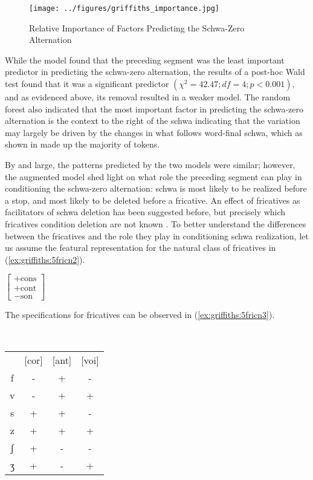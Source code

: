 \documentclass[output=paper,colorlinks,citecolor=brown,
]{langscibook}
\begin{document}
\begin{figure}

\texttt{[image: ../figures/griffiths\_importance.jpg]}
\caption{Relative Importance of Factors Predicting the Schwa-Zero Alternation}
\label{fig:griffiths:importance}
\end{figure}

While the model found that the preceding segment was the least important predictor in predicting the schwa-zero alternation, the results of a post-hoc Wald test found that it was a significant predictor $(\chi^2=42.47 ; df =4 ; p <0.001)$, and as evidenced above, its removal resulted in a weaker model. The random forest also indicated that the most important factor in predicting the schwa-zero alternation is the context to the right of the schwa indicating that the variation may largely be driven by the changes in what follows word-final schwa, which as shown in  made up the majority of tokens.

By and large, the patterns predicted by the two models were similar; however, the augmented model shed light on what role the preceding segment can play in conditioning the schwa-zero alternation: schwa is most likely to be realized before a stop, and most likely to be deleted before a fricative. An effect of fricatives as facilitators of schwa deletion has been suggested before, but precisely which fricatives condition deletion are not known \citep{rialland}. To better understand the differences between the fricatives and the role they play in conditioning schwa realization, let us assume the featural representation for the natural class of fricatives in (\ref{ex:griffiths:5fricn2}).

\begin{exe}
\ex\label{ex:griffiths:5fricn2} $\begin{bmatrix}
+\text{cons}\\
+\text{cont}\\
-\text{son}
\end{bmatrix}$
\end{exe}
The specifications for fricatives can be observed in (\ref{ex:griffiths:5fricn3}).
\begin{exe}
\ex\label{ex:griffiths:5fricn3} \ \\ \begin{tabular}{cccc}
 & [cor] & [ant] & [voi] \\ \cline{2-4} 
\multicolumn{1}{c|}{f} & - & + & - \\
\multicolumn{1}{c|}{v} & - & + & + \\
\multicolumn{1}{c|}{s} & + & + & - \\
\multicolumn{1}{c|}{z} & + & + & + \\
\multicolumn{1}{c|}{ʃ} & + & - & - \\
\multicolumn{1}{c|}{ʒ} & + & - & +
\end{tabular}
\end{exe}
\end{document}
